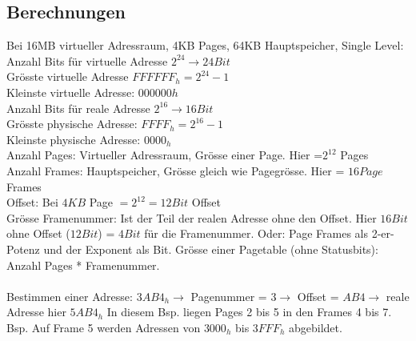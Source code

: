\subsection{Berechnungen}
Bei 16MB virtueller Adressraum, 4KB Pages, 64KB Hauptspeicher, Single Level:\\
\textcolor{myblue}{Anzahl Bits für virtuelle Adresse} $2^{24} \rightarrow 24 Bit$\\
\textcolor{myblue}{Grösste virtuelle Adresse} $FFFFFF_h = 2^{24} - 1$\\
\textcolor{myblue}{Kleinste virtuelle Adresse}: $000000 h$\\
\textcolor{myblue}{Anzahl Bits für reale Adresse} $2^{16} \rightarrow 16 Bit$\\
\textcolor{myblue}{Grösste physische Adresse}: $FFFF_h = 2^{16} - 1$\\
\textcolor{myblue}{Kleinste physische Adresse}: $0000_h$\\
\textcolor{myblue}{Anzahl Pages}: Virtueller Adressraum, Grösse einer Page. Hier =$2^{12}$ Pages\\
\textcolor{myblue}{Anzahl Frames}: Hauptspeicher, Grösse gleich wie Pagegrösse. Hier = $16 Page$ Frames\\
\textcolor{myblue}{Offset}: Bei $4 KB$ Page $= 2^{12} = 12 Bit$ Offset\\
\textcolor{myblue}{Grösse Framenummer}: Ist der Teil der realen Adresse ohne den Offset. Hier $16 Bit$ ohne Offset ($12 Bit$) = $4 Bit$ für die Framenummer. Oder: Page Frames als 2-er-Potenz und der Exponent als Bit.
\textcolor{myblue}{Grösse einer Pagetable (ohne Statusbits)}: Anzahl Pages * Framenummer.\\\\
\textcolor{myblue}{Bestimmen einer Adresse}: $3AB4_h \rightarrow$ Pagenummer = $3 \rightarrow$ Offset = $AB4 \rightarrow$ reale Adresse hier $5AB4_h$ In diesem Bsp. liegen Pages 2 bis 5 in den Frames 4 bis 7. Bsp. Auf Frame 5 werden Adressen von $3000_h$ bis $3FFF_h$ abgebildet.
